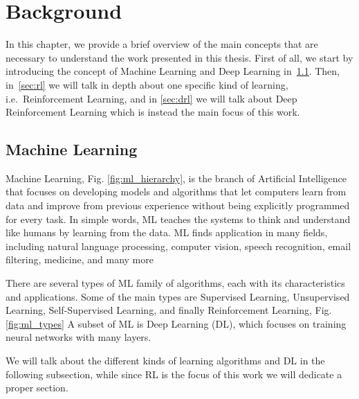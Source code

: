 
\chapter{Background}
\label{sec:background}
In this chapter, we provide a brief overview of the main concepts that are necessary to understand the work presented in this thesis.
First of all, we start by introducing the concept of Machine Learning and Deep Learning in~\ref{sec:machine_learning}.
Then, in~\ref{sec:rl} we will talk in depth about one specific kind of learning, i.e.\ Reinforcement Learning, and in \ref{sec:drl} we will talk about Deep Reinforcement Learning which is instead the main focus of this work.

\section{Machine Learning}
\label{sec:machine_learning}

Machine Learning, Fig. \ref{fig:ml_hierarchy}, is the branch of Artificial Intelligence that focuses on developing models and algorithms that let computers learn from data and improve from previous experience without being explicitly programmed for every task.
In simple words, ML teaches the systems to think and understand like humans by learning from the data.
ML finds application in many fields, including natural language processing, computer vision, speech recognition, email filtering, medicine, and many more

There are several types of ML family of algorithms, each with its characteristics and applications.
Some of the main types are Supervised Learning, Unsupervised Learning, Self-Supervised Learning, and finally Reinforcement Learning, Fig.\ref{fig:ml_types}
A subset of ML is Deep Learning (DL), which focuses on training neural networks with many layers.

We will talk about the different kinds of learning algorithms and DL in the following subsection, while since RL is the focus of this work we will dedicate a proper section.





